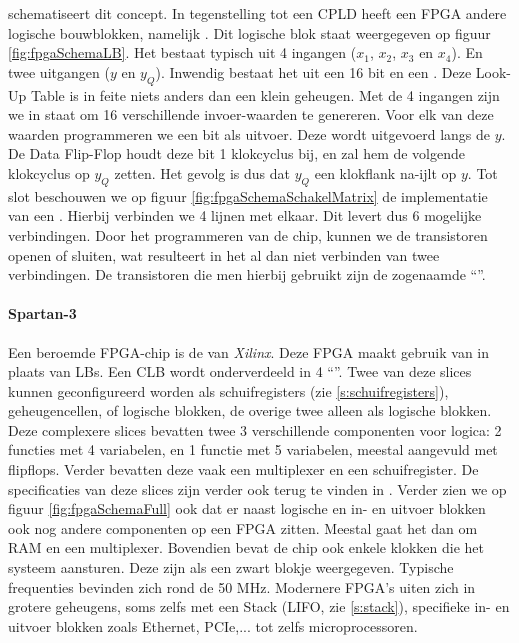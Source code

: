 schematiseert dit concept. In tegenstelling tot een CPLD heeft een FPGA andere logische bouwblokken, namelijk . Dit logische blok staat weergegeven op figuur \ref{fig:fpgaSchemaLB}. Het bestaat typisch uit 4 ingangen ($x_1$, $x_2$, $x_3$ en $x_4$). En twee uitgangen ($y$ en $y_Q$). Inwendig bestaat het uit een 16 bit  en een . Deze Look-Up Table is in feite niets anders dan een klein geheugen. Met de 4 ingangen zijn we in staat om 16 verschillende invoer-waarden te genereren. Voor elk van deze waarden programmeren we een bit als uitvoer. Deze wordt uitgevoerd langs de $y$. De Data Flip-Flop houdt deze bit 1 klokcyclus bij, en zal hem de volgende klokcyclus op $y_Q$ zetten. Het gevolg is dus dat $y_Q$ een klokflank na-ijlt op $y$. Tot slot beschouwen we op figuur \ref{fig:fpgaSchemaSchakelMatrix} de implementatie van een . Hierbij verbinden we 4 lijnen met elkaar. Dit levert dus 6 mogelijke verbindingen. Door het programmeren van de chip, kunnen we de transistoren openen of sluiten, wat resulteert in het al dan niet verbinden van twee verbindingen. De transistoren die men hierbij gebruikt zijn de zogenaamde ``''.
\paragraph{Spartan-3}
Een beroemde FPGA-chip is de  van \emph{Xilinx}. Deze FPGA maakt gebruik van  in plaats van LBs. Een CLB wordt onderverdeeld in 4 ``''. Twee van deze slices kunnen geconfigureerd worden als schuifregisters (zie \ref{s:schuifregisters}), geheugencellen, of logische blokken, de overige twee alleen als logische blokken. Deze complexere slices bevatten twee 3 verschillende componenten voor logica: 2 functies met 4 variabelen, en 1 functie met 5 variabelen, meestal aangevuld met flipflops. Verder bevatten deze vaak een multiplexer en een schuifregister. De specificaties van deze slices zijn verder ook terug te vinden in \cite[p.~22-23]{xilinxFpgaDs099}. Verder zien we op figuur \ref{fig:fpgaSchemaFull} ook dat er naast logische en in- en uitvoer blokken ook nog andere componenten op een FPGA zitten. Meestal gaat het dan om RAM en een multiplexer. Bovendien bevat de chip ook enkele klokken die het systeem aansturen. Deze zijn als een zwart blokje weergegeven. Typische frequenties bevinden zich rond de 50 MHz. Modernere FPGA's uiten zich in grotere geheugens, soms zelfs met een Stack (LIFO, zie \ref{s:stack}), specifieke in- en uitvoer blokken zoals Ethernet, PCIe,... tot zelfs microprocessoren.
